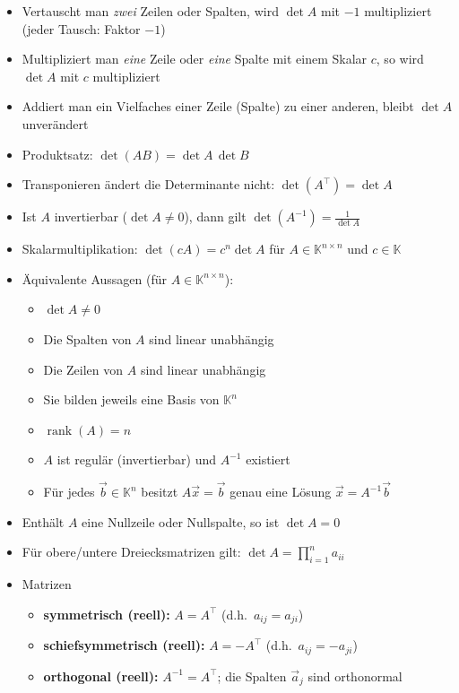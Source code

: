\documentclass[a4paper,11pt,oneside,open=any,parskip=half, DIV=15]{scrreprt}
\begin{document}
   \begin{itemize}

      \item Vertauscht man \emph{zwei} Zeilen oder Spalten, wird \(\det A\) mit \(-1\) multipliziert (jeder Tausch: Faktor \(-1\))
      \item Multipliziert man \emph{eine} Zeile oder \emph{eine} Spalte mit einem Skalar \(c\), so wird \(\det A\) mit \(c\) multipliziert
      \item Addiert man ein Vielfaches einer Zeile (Spalte) zu einer anderen, bleibt \(\det A\) unverändert
      \item Produktsatz: \(\det(AB)=\det A\,\det B\)
      \item Transponieren ändert die Determinante nicht: \(\det(A^{\top})=\det A\)
      \item Ist \(A\) invertierbar (\(\det A\neq 0\)), dann gilt \(\det(A^{-1})=\frac{1}{\det A}\)
      \item Skalarmultiplikation: \(\det(cA)=c^{n}\det A\) für \(A\in\mathbb{K}^{n\times n}\) und \(c\in\mathbb{K}\)
      \item Äquivalente Aussagen (für \(A\in\mathbb{K}^{n\times n}\)):
         \begin{itemize}
            \item \(\det A \neq 0\)
            \item Die Spalten von \(A\) sind linear unabhängig
            \item Die Zeilen von \(A\) sind linear unabhängig
            \item Sie bilden jeweils eine Basis von \(\mathbb{K}^{n}\)
            \item \(\operatorname{rank}(A)=n\)
            \item \(A\) ist regulär (invertierbar) und \(A^{-1}\) existiert
            \item Für jedes \(\vec b\in\mathbb{K}^{n}\) besitzt \(A\vec x=\vec b\) genau eine Lösung \(\vec x=A^{-1}\vec b\)
         \end{itemize}
      \item Enthält \(A\) eine Nullzeile oder Nullspalte, so ist \(\det A=0\)
      \item Für obere/untere Dreiecksmatrizen gilt: \(\det A=\prod_{i=1}^{n} a_{ii}\)

      \item Matrizen
         \begin{itemize}
            \item \textbf{symmetrisch (reell):} \(A=A^{\top}\) (d.h.\ \(a_{ij}=a_{ji}\))
            \item \textbf{schiefsymmetrisch (reell):} \(A=-A^{\top}\) (d.h.\ \(a_{ij}=-a_{ji}\))
            \item \textbf{orthogonal (reell):} \(A^{-1}=A^{\top}\); die Spalten \(\vec a_{j}\) sind orthonormal
         \end{itemize}

   \end{itemize}
\end{document}
